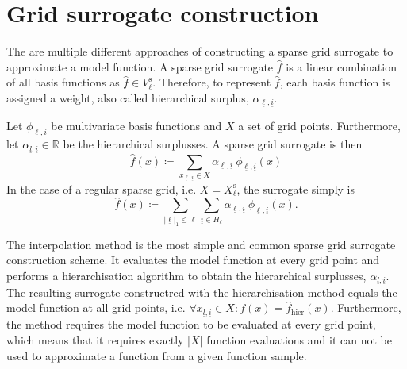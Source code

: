 \documentclass[
  a4paper,  %
  twoside,  %
  bibliography=totoc,
  headsepline,
  cleardoublepage=empty,
  parskip=half,
  draft=false
]{scrbook}
\begin{document}
\section{Grid surrogate construction}
\label{sec:gsc}

The are multiple different approaches of constructing a sparse grid surrogate to approximate a model function.
A sparse grid surrogate $\hat{f}$ is a linear combination of all basis functions as $\hat{f} \in V^{\text{s}}_{\ell}$.
Therefore, to represent $\hat{f}$, each basis function is assigned a weight, also called hierarchical surplus, $\alpha_{\underline{\ell},\underline{i}}$.

\begin{definition}
Let $\phi_{\underline{\ell},\underline{i}}$ be multivariate basis functions and $X$ a set of grid points.
Furthermore, let $\alpha_{\underline{l},\underline{i}} \in \mathds{R}$ be the hierarchical surplusses.
A sparse grid surrogate is then
\begin{equation}
\hat{f}(x) \coloneqq \sum_{x_{\underline{\ell},\underline{i}} \in X} \alpha_{\underline{\ell},\underline{i}} ~ \phi_{
\underline{\ell},\underline{i}}(x)
\end{equation}
In the case of a regular sparse grid, i.e. $X=X^{\text{s}}_{\ell}$, the surrogate simply is
\begin{equation}
\hat{f}(x) \coloneqq \sum_{|\underline{\ell}|_1 \leq \ell} \sum_{\underline{i} \in {H_{\underline{\ell}}}} \alpha_{\underline{\ell},\underline{i}} ~ \phi_{
\underline{\ell},\underline{i}}(x).
\end{equation}
\end{definition}

The interpolation method is the most simple and common sparse grid surrogate construction scheme.
It evaluates the model function at every grid point and performs a hierarchisation algorithm \cite{} to obtain the hierarchical surplusses, $\alpha_{\underline{l},\underline{i}}$.
The resulting surrogate constructred with the hierarchisation method equals the model function at all grid points, i.e. $\forall x_{\underline{l},\underline{i}} \in X \colon f(x)=\hat{f}_{\text{hier}}(x)$.
Furthermore, the method requires the model function to be evaluated at every grid point, which means that it requires exactly $|X|$ function evaluations and it can not be used to approximate a function from a given function sample.
\end{document}
